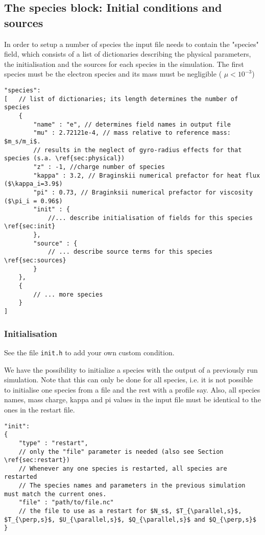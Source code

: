 \subsection{The species block: Initial conditions and sources} \label{sec:species}

In order to setup a number of species the input file needs to contain the "species" field, which
consists of a list of dictionaries describing the physical parameters, the initialisation and the sources
for each species in the simulation. The first species must be the electron species and its mass
    must be negligible ( $\mu <10^{-3}$)
\begin{verbatim}
"species":
[   // list of dictionaries; its length determines the number of species
    {
        "name" : "e", // determines field names in output file
        "mu" : 2.72121e-4, // mass relative to reference mass: $m_s/m_i$.
        // results in the neglect of gyro-radius effects for that species (s.a. \ref{sec:physical})
        "z" : -1, //charge number of species
        "kappa" : 3.2, // Braginskii numerical prefactor for heat flux ($\kappa_i=3.9$)
        "pi" : 0.73, // Braginksii numerical prefactor for viscosity ($\pi_i = 0.96$)
        "init" : {
            //... describe initialisation of fields for this species \ref{sec:init}
        },
        "source" : {
            // ... describe source terms for this species \ref{sec:sources}
        }
    },
    {
        // ... more species
    }
]
\end{verbatim}


\subsubsection{Initialisation} \label{sec:init}

See the file {\tt init.h} to add your own custom condition.

We have the possibility to
initialize a species with the output of a previously
run simulation. Note that this can only be done for all species, i.e. it is not possible
to initialise one species from a file and the rest with a profile say.
Also, all species names, mass charge, kappa and pi values in the input file must be identical to the ones in the restart file.
\begin{verbatim}
"init":
{
    "type" : "restart",
    // only the "file" parameter is needed (also see Section \ref{sec:restart})
    // Whenever any one species is restarted, all species are restarted
    // The species names and parameters in the previous simulation must match the current ones.
    "file" : "path/to/file.nc"
    // the file to use as a restart for $N_s$, $T_{\parallel,s}$, $T_{\perp,s}$, $U_{\parallel,s}$, $Q_{\parallel,s}$ and $Q_{\perp,s}$
}
\end{verbatim}

